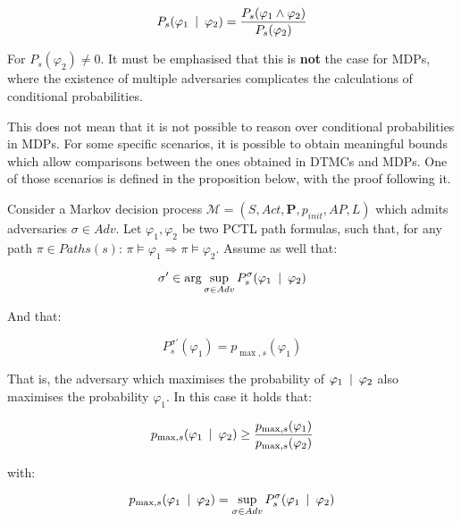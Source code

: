 \begin{equation}
	P_s (\varphi_1 \:\mid\: \varphi_2) = \frac{P_s (\varphi_1 \wedge \varphi_2)}{P_s (\varphi_2)}
\end{equation}

For $P_s (\varphi_2) \neq 0$. It must be emphasised that this is \textbf{not} the case for MDPs, where the existence of multiple adversaries complicates the calculations of conditional probabilities.

This does not mean that it is not possible to reason over conditional probabilities in MDPs. For some specific scenarios, it is possible to obtain meaningful bounds which allow comparisons between the ones obtained in DTMCs and MDPs. One of those scenarios is defined in the proposition below, with the proof following it.

\begin{proposition}
Consider a Markov decision process $\mathcal{M} = (S, Act, \mathbf{P}, p_{init}, AP, L)$ which admits adversaries $\sigma \in Adv$. Let $\varphi_1, \varphi_2$ be two PCTL path formulas, such that, for any path $\pi \in Paths(s)$: $\pi \models \varphi_1 \Rightarrow \pi \models \varphi_2$. Assume as well that:

\begin{equation}
	\sigma' \in \arg\sup_{\sigma \in Adv} P^{\sigma}_s (\varphi_1 \:\mid\: \varphi_2)
\end{equation}

And that:

\begin{equation}
	P^{\sigma'}_s (\varphi_1) = p_{\max, s} (\varphi_1)
\end{equation}

That is, the adversary which maximises the probability of $\varphi_1 \:\mid\: \varphi_2$ also maximises the probability $\varphi_1$. In this case it holds that:

\begin{equation}
	p_{\max, s} (\varphi_1 \:\mid\: \varphi_2) \geq \frac{p_{\max, s} (\varphi_1)}{p_{\max, s} (\varphi_2)}
\end{equation}

with:

\begin{equation}
	p_{\max, s} (\varphi_1 \:\mid\: \varphi_2) = \sup_{\sigma \in Adv} P^{\sigma}_s (\varphi_1 \:\mid\: \varphi_2)
\end{equation}

\end{proposition}
 
